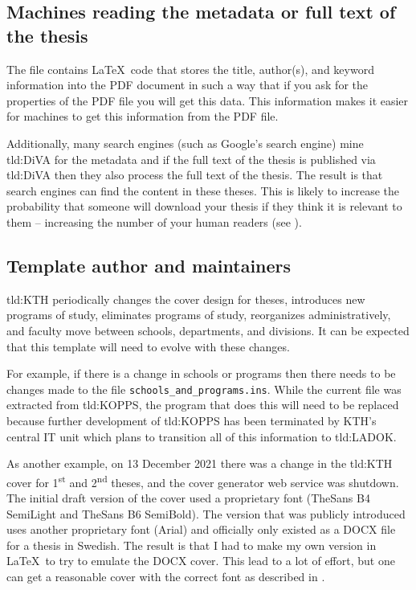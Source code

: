\subsection{Machines reading the metadata or full text of the thesis}
\label{sec:searchEngines}
The file  contains \LaTeX\ code that stores the title, author(s), and keyword information into the PDF document in such a way that if you ask for the properties of the PDF file you will get this data. This information makes it easier for machines to get this information from the PDF file. 

Additionally, many search engines (such as Google's search engine) mine \gls{tld:DiVA} for the metadata and if the full text of the thesis is published via \gls{tld:DiVA} then they also process the full text of the thesis. The result is that search engines can find the content in these theses.  This is likely to increase the probability that someone will download your thesis if they think it is relevant to them -- increasing the number of your human readers (see ).

\subsection{Template author and maintainers}
\label{sec:maintainer}

\gls{tld:KTH} periodically changes the cover design for theses, introduces new programs of study, eliminates programs of study, reorganizes administratively,
and faculty move between schools, departments, and divisions. It can be expected that this template will need to evolve with these changes.

For example, if there is a change in schools or programs then there needs to be changes made to the file \texttt{schools\_and\_programs.ins}. While the current file was extracted from \gls{tld:KOPPS}, the program that does this will need to be replaced because further development of \gls{tld:KOPPS} has been terminated by KTH's central IT unit which plans to transition all of this information to \gls{tld:LADOK}.

As another example, on 13 December 2021 there was a change in the \gls{tld:KTH} cover for 1\textsuperscript{st} and 2\textsuperscript{nd} theses, and the cover generator web service was shutdown. The initial draft version of the cover used a proprietary font (TheSans B4 SemiLight and TheSans B6 SemiBold). The version that was publicly introduced uses another proprietary font (Arial) and officially only existed as a DOCX file for a thesis in Swedish. The result is that I had to make my own version in \LaTeX\  to try to emulate the DOCX cover. This lead to a lot of effort, but one can get a reasonable cover with the correct font as described in .


